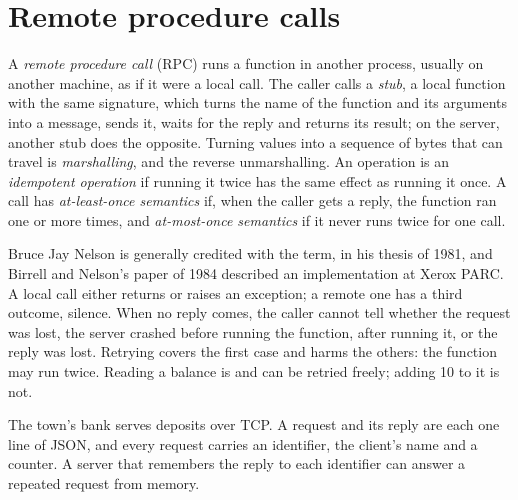 \section{Remote procedure calls}\label{sec:b3:distributed-systems:rpc}

\begin{definition}\label{def:b3:distributed-systems:rpc}
A \emph{remote procedure call} (RPC) runs a function in another process, usually on another machine, as if it were a local call. The caller calls a \emph{stub}, a local function with the same signature, which turns the name of the function and its arguments into a message, sends it, waits for the reply and returns its result; on the server, another stub does the opposite. Turning values into a sequence of bytes that can travel is \emph{marshalling}, and the reverse unmarshalling. An operation is an \emph{idempotent operation} if running it twice has the same effect as running it once. A call has \emph{at-least-once semantics} if, when the caller gets a reply, the function ran one or more times, and \emph{at-most-once semantics} if it never runs twice for one call.
\end{definition}

Bruce Jay Nelson is generally credited with the term, in his thesis of 1981, and Birrell and Nelson's paper of 1984 described an implementation at Xerox PARC. %
A local call either returns or raises an exception; a remote one has a third outcome, silence. When no reply comes, the caller cannot tell whether the request was lost, the server crashed before running the function, after running it, or the reply was lost. Retrying covers the first case and harms the others: the function may run twice. Reading a balance is  and can be retried freely; adding 10 to it is not.

The town's bank serves deposits over TCP. A request and its reply are each one line of JSON, and every request carries an identifier, the client's name and a counter. A server that remembers the reply to each identifier can answer a repeated request from memory.

\label{lst:b3:distributed-systems:server}

